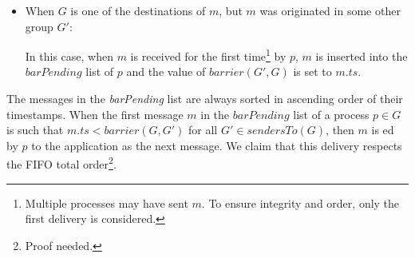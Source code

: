 \documentclass[times, 10pt]{article}
\begin{document}
\begin{itemize}
  In this case, when $m$ is received, $p$ tries to initiate a consensus instance within $G$ to decide $m$. If $p$ cannot start the proposal now, $m$ is enqueued in $propPending$ for being proposed later along with other pending messages. Then, once $p$ may start a new instance, all messages in $propPending$ that have been already decided are discarded from $propPending$. The rest is proposed as a batch in the new consensus instance. Once any message $m$ is decided, $p$ checks whether some message $m_{prv} : m_{prv}.ts > m.ts$ has been decided previously. If that is the case, the value of $m.ts$ is changed to a value greater than the timestamp of any other message previously decided within $G$. Then, if $G \in m.dst$, $m$ is inserted in the $barPending$ list. Besides, when $m$ is decided, $p$ sends $m$ to every \mbox{$p' \in (m.dst \setminus \{G\})$}. When $m$ is received by each $p' \in G'$, $p'$ checks whether it has ever inserted $m$ in its own $barPending$ list. If not, $p'$ inserts $m$ into $barPending$ and adjusts $barrier(G, G')$ to $m.ts$. To ensure that, once a message $m$ is received from another group $G$, every message $m' : m'.ts<m.ts$ also from $G$ has already been received, every message is sent through a lossless FIFO channel\footnote{An ordinary TCP connection would be enough to provide such FIFO lossless channel. Here, we use FIFO reliable multicast.}.
  
  \item When $G$ is one of the destinations of $m$, but $m$ was originated in some other group $G'$:
  
  In this case, when $m$ is received for the first time\footnote{Multiple processes may have sent $m$. To ensure integrity and order, only the first delivery is considered.} by $p$, $m$ is inserted into the $barPending$ list of $p$ and the value of $barrier(G',G)$ is set to $m.ts$.
\end{itemize}

The messages in the \textit{barPending} list are always sorted in ascending order of their timestamps. When the first message $m$ in the $barPending$ list of a process $p \in G$ is such that $m.ts < barrier(G, G')$ for all $G' \in sendersTo(G)$, then $m$ is \cons{}ed by $p$ to the application as the next message. We claim that this delivery respects the FIFO total order\footnote{Proof needed.}.

\end{document}
